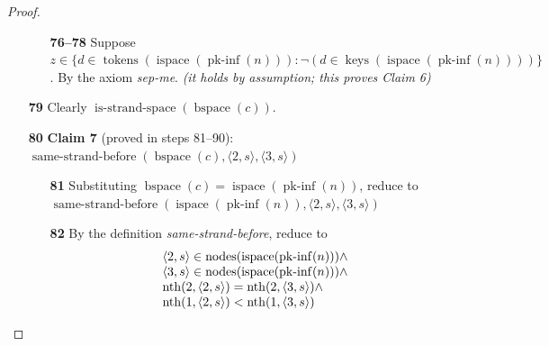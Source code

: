 \documentclass[11pt]{article}
\theoremstyle{plain}
\begin{document}
\begin{proof}
\begin{itemize}[leftmargin=2.8em, itemsep=4pt, parsep=1pt]
  \begin{itemize}[leftmargin=2.8em, itemsep=4pt, parsep=1pt]
  \item[\textbf{76--78}] Suppose $z \in \{d \in \operatorname{tokens}(\operatorname{ispace}(\operatorname{pk\text{-}inf}(n))) : \neg (d \in \operatorname{keys}(\operatorname{ispace}(\operatorname{pk\text{-}inf}(n))))\}$. By the axiom \emph{sep-me}.  \emph{(it holds by assumption; this proves Claim 6)}
  \end{itemize}
  \item[\textbf{79}] Clearly $\operatorname{is\text{-}strand\text{-}space}(\operatorname{bspace}(c))$.
  \item[\textbf{80}] \textbf{Claim 7} (proved in steps 81--90): $\operatorname{same\text{-}strand\text{-}before}(\operatorname{bspace}(c), \langle 2, s \rangle, \langle 3, s \rangle)$
  \begin{itemize}[leftmargin=2.8em, itemsep=4pt, parsep=1pt]
  \item[\textbf{81}] Substituting $\operatorname{bspace}(c) = \operatorname{ispace}(\operatorname{pk\text{-}inf}(n))$, reduce to $\operatorname{same\text{-}strand\text{-}before}(\operatorname{ispace}(\operatorname{pk\text{-}inf}(n)), \langle 2, s \rangle, \langle 3, s \rangle)$
  \item[\textbf{82}] By the definition \emph{same-strand-before}, reduce to
\begin{equation*}
\begin{array}{@{}l@{}} \langle 2, s \rangle \in \operatorname{nodes}(\operatorname{ispace}(\operatorname{pk\text{-}inf}(n))) \wedge \\ \langle 3, s \rangle \in \operatorname{nodes}(\operatorname{ispace}(\operatorname{pk\text{-}inf}(n))) \wedge \\ \operatorname{nth}(2, \langle 2, s \rangle) = \operatorname{nth}(2, \langle 3, s \rangle) \wedge \\ \operatorname{nth}(1, \langle 2, s \rangle) < \operatorname{nth}(1, \langle 3, s \rangle) \end{array}
\end{equation*}


\end{itemize}
\end{itemize}
\end{proof}
\end{document}

